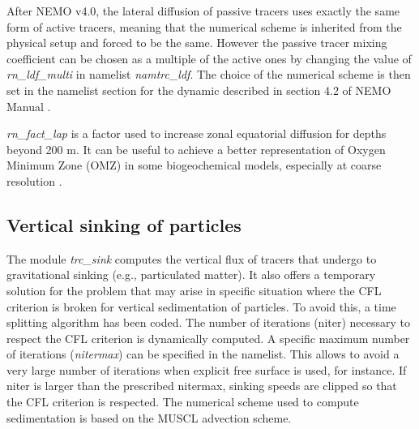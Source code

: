 \documentclass[../main/TOP_manual]{subfiles}
\begin{document}
After NEMO v4.0, the lateral diffusion of passive tracers uses exactly the same form of active tracers, meaning that the numerical scheme is inherited from the physical setup and forced to be the same.
However the passive tracer mixing coefficient can be chosen as a multiple of the active ones by changing the value of \textit{rn\_ldf\_multi} in namelist \textit{namtrc\_ldf}.
The choice of the numerical scheme is then set in the  namelist section for the dynamic described in section 4.2 of NEMO Manual \citep{nemo_manual}.

\textit{rn\_fact\_lap} is a factor used to increase zonal equatorial diffusion for depths beyond 200 m. It can be useful to achieve a better representation of Oxygen Minimum Zone (OMZ) in some biogeochemical models, especially at coarse resolution \citep{getzlaff_2013}.



\subsection{Vertical sinking of particles}

The module \textit{trc\_sink} computes the vertical flux of tracers that undergo to gravitational sinking (e.g., particulated matter). It also offers a temporary solution for the problem that may arise in specific situation where the CFL criterion is broken for vertical sedimentation of particles. To avoid this, a time splitting algorithm has been coded. The number of iterations (niter) necessary to respect the CFL criterion is dynamically computed. A specific maximum number of iterations (\textit{nitermax}) can be specified in the namelist. This allows to avoid a very large number of iterations when explicit free surface is used, for instance. If niter is larger than the prescribed nitermax, sinking speeds are clipped so that the CFL criterion is respected. The numerical scheme used to compute sedimentation is based on the MUSCL advection scheme.
\end{document}
